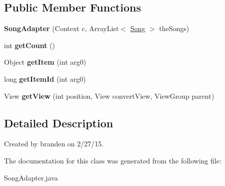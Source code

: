 \subsection*{Public Member Functions}
\begin{DoxyCompactItemize}
\item 
\hypertarget{classcom_1_1chopin_1_1SongAdapter_a8cd1312807a8d367b6ceddc02120d1f4}{}{\bfseries Song\+Adapter} (Context c, Array\+List$<$ \hyperlink{classcom_1_1chopin_1_1Song}{Song} $>$ the\+Songs)\label{classcom_1_1chopin_1_1SongAdapter_a8cd1312807a8d367b6ceddc02120d1f4}

\item 
\hypertarget{classcom_1_1chopin_1_1SongAdapter_aa520e846979d66d2649172dd2c296e4e}{}int {\bfseries get\+Count} ()\label{classcom_1_1chopin_1_1SongAdapter_aa520e846979d66d2649172dd2c296e4e}

\item 
\hypertarget{classcom_1_1chopin_1_1SongAdapter_a1748f00cb93784996f310436ea7c307e}{}Object {\bfseries get\+Item} (int arg0)\label{classcom_1_1chopin_1_1SongAdapter_a1748f00cb93784996f310436ea7c307e}

\item 
\hypertarget{classcom_1_1chopin_1_1SongAdapter_aab43309778c8eda35828b4302379a497}{}long {\bfseries get\+Item\+Id} (int arg0)\label{classcom_1_1chopin_1_1SongAdapter_aab43309778c8eda35828b4302379a497}

\item 
\hypertarget{classcom_1_1chopin_1_1SongAdapter_a344c61b360d6f749574fc56ad3a96ba0}{}View {\bfseries get\+View} (int position, View convert\+View, View\+Group parent)\label{classcom_1_1chopin_1_1SongAdapter_a344c61b360d6f749574fc56ad3a96ba0}

\end{DoxyCompactItemize}


\subsection{Detailed Description}
Created by branden on 2/27/15. 

The documentation for this class was generated from the following file\+:\begin{DoxyCompactItemize}
\item 
Song\+Adapter.\+java\end{DoxyCompactItemize}
